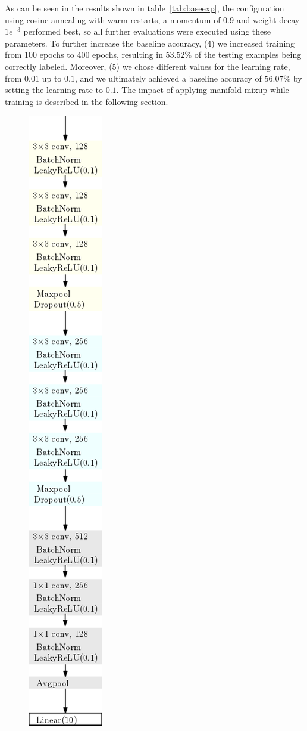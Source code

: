 As can be seen in the results shown in table~\ref{tab:baseexp}, the configuration using cosine annealing with warm restarts, a momentum of 0.9 and weight decay $1e^{-3}$ performed best, so all further evaluations were executed using these parameters. 
To further increase the baseline accuracy, (4) we increased training from 100 epochs to 400 epochs, resulting in $53.52\%$ of the testing examples being correctly labeled. 
Moreover, (5) we chose different values for the learning rate, from $0.01$ up to $0.1$, and we ultimately achieved a baseline accuracy of $\bm{56.07\%}$ by setting the learning rate to $0.1$.
The impact of applying manifold mixup while training is
described in the following section.

\begin{figure}
    \centering
    \includegraphics[scale=0.6]{report/figures/net.png}

\end{figure}
